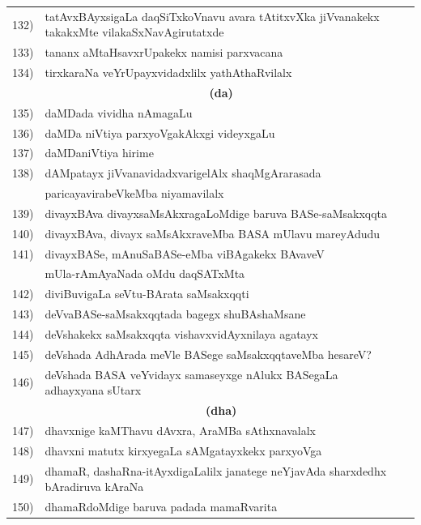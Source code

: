 {\begin{longtable}{@{}cp{7.4cm}r}
132) & tatAvxBAyxsigaLa daqSiTxkoVnavu avara tAtitxvXka jiVvanakekx takakxMte vilakaSxNavAgirutatxde & \pageref{page175}\\
133) & tananx aMtaHsavxrUpakekx namisi parxvacana & \pageref{page80}\\
134) & tirxkaraNa veYrUpayxvidadxlilx yathAthaRvilalx & \pageref{page69}\\[0.3cm]
     &  \multicolumn{1}{c}{\textbf{(da)}}  & \\[0.3cm]
135) & daMDada vividha nAmagaLu &  \pageref{page100}\\
136) & daMDa niVtiya parxyoVgakAkxgi videyxgaLu & \pageref{page99}\\
137) & daMDaniVtiya hirime & \pageref{page96} \\
138) & dAMpatayx jiVvanavidadxvarigelAlx shaqMgArarasada & \pageref{page221}\\
     & paricayavirabeVkeMba niyamavilalx & \pageref{page221}\\
139) & divayxBAva divayxsaMsAkxragaLoMdige baruva BASe-saMsakxqqta & \pageref{page10}\\
140) & divayxBAva, divayx saMsAkxraveMba BASA mUlavu mareyAdudu & \pageref{page15}\\
141) & divayxBASe, mAnuSaBASe-eMba viBAgakekx BAvaveV &  \\
     & mUla-rAmAyaNada oMdu daqSATxMta & \pageref{page14}\\
142) & diviBuvigaLa seVtu-BArata saMsakxqqti & \pageref{page23}\\
143) & deVvaBASe-saMsakxqqtada bagegx shuBAshaMsane & \pageref{page20}\\
144) & deVshakekx saMsakxqqta vishavxvidAyxnilaya agatayx & \pageref{page37}\\
145) & deVshada AdhArada meVle BASege saMsakxqqtaveMba hesareV? & \pageref{page7}\\
146) & deVshada BASA veYvidayx samaseyxge nAlukx BASegaLa adhayxyana sUtarx &\pageref{page44}\\[0.3cm]     
     &    \multicolumn{1}{c}{\textbf{(dha)}}  & \\[0.3cm] 
147) & dhavxnige kaMThavu dAvxra, AraMBa sAthxnavalalx & \pageref{page171}\\
148) & dhavxni matutx kirxyegaLa sAMgatayxkekx parxyoVga & \pageref{page120}\\
149) & dhamaR, dashaRna-itAyxdigaLalilx janatege neYjavAda sharxdedhx bAradiruva kAraNa & \pageref{page50}\\
150) & dhamaRdoMdige baruva padada mamaRvarita  & \\

\end{longtable}}
